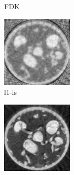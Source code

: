 \documentclass{article}
\begin{document}
\begin{figure}[!h]
\begin{subfigure}[b]{0.38\linewidth}
        \caption{FDK}
    \end{subfigure}
\quad
    \begin{subfigure}[b]{0.38\linewidth}
        \includegraphics[width=\textwidth]{../images/sprouts/csIm.png}
        \caption{l1-ls}
     \end{subfigure}
\quad
    \begin{subfigure}[b]{0.38\linewidth}
        \includegraphics[width=\textwidth]{../images/sprouts/plainPriorIm.png}

\end{subfigure}
\end{figure}
\end{document}
